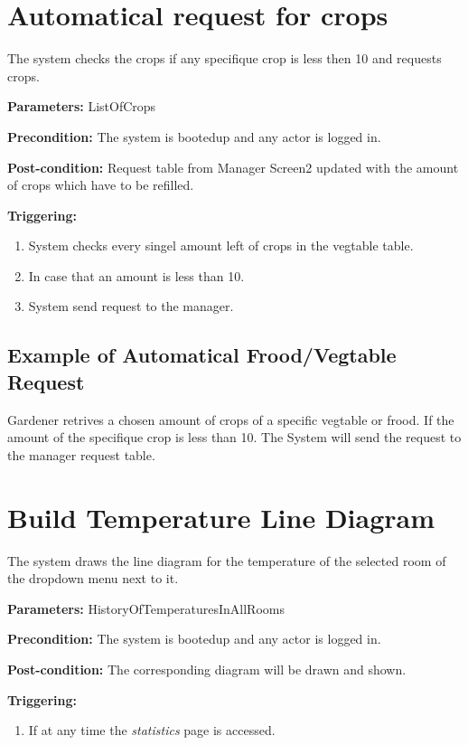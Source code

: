 \section{Automatical request for crops}
\label{operation:RequestForCrops}
The system checks the crops if any specifique crop is less then 10 and requests
crops.

\begin{description}

\item \textbf{Parameters:} ListOfCrops
\item \textbf{Precondition:} The system is bootedup and any actor is logged in.
\item \textbf{Post-condition:} Request table from Manager Screen2 updated with
the amount of crops which have to be refilled.

\item \textbf{Triggering:}
\begin{enumerate}
\item System checks every singel amount left of crops in the vegtable table.
\item In case that an amount is less than 10.
\item System send request to the manager.
\end{enumerate}
\end{description}

\subsection{Example of Automatical Frood/Vegtable Request}
Gardener retrives a chosen amount of crops of a specific vegtable or frood.
If the amount of the specifique crop is less than 10.
The System will send the request to the manager request table.




\section{Build Temperature Line Diagram}
\label{operation:BuildTemperatureDiagram}
The system draws the line diagram for the temperature of the selected room of
the dropdown menu next to it.

\begin{description}

\item \textbf{Parameters:} HistoryOfTemperaturesInAllRooms
\item \textbf{Precondition:} The system is bootedup and any actor is logged in.
\item \textbf{Post-condition:} The corresponding diagram will be drawn and
shown.

\item \textbf{Triggering:}
\begin{enumerate}
\item If at any time the \emph{statistics} page is accessed.
\end{enumerate}
\end{description}

